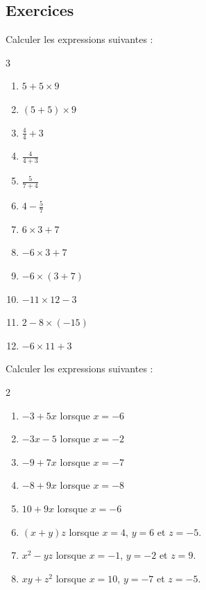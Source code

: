 \documentclass[main.tex]{subfiles}
\begin{document}
\subsection{Exercices}


\begin{exercise}[\cancel{\faCalculator}] Calculer les expressions suivantes :\hfill 
	\begin{multicols}{3}
		\begin{enumerate}[label={$\alph*=$}, leftmargin=*] 
			\item $5+5\times 9$
			\item $(5+5)\times 9$
			\item $\tfrac{4}{4}+3$
			\item $\tfrac{4}{4+3}$
			\item $\tfrac{5}{7+4}$
			\item $4-\tfrac{5}{7}$   
			\item $6\times 3+7$ 
			\item $-6\times 3+7$
			\item $-6\times (3+7)$
			\item $-11\times 12-3$
			\item $2-8\times(-15)$
			\item $-6\times 11 +3$
		\end{enumerate}
	\end{multicols}
\end{exercise}
\begin{exercise} Calculer les expressions suivantes  :\hfill 
	\begin{multicols}{2}
		\begin{enumerate}[label={\alph*)}, leftmargin=*] 
			\item $-3+5x$ lorsque $x=-6$ 		
			\item $-3x-5$ lorsque $x=-2$ 		%
			\item $-9+7x$ lorsque $x=-7$ 		%
			\item $-8+9x$ lorsque $x=-8$ 		%
			\item $10+9x$ lorsque $x=-6$ 		%
			\item $(x+y)z$ lorsque $x=4$, $y=6$ et $z=-5$. 	%
			\item $x^2-yz$ lorsque $x=-1$, $y=-2$ et $z=9$. 	%
			\item $xy+z^2$ lorsque $x=10$, $y=-7$ et $z=-5$. 	%
		\end{enumerate}
	\end{multicols}
\end{exercise}
\end{document}

